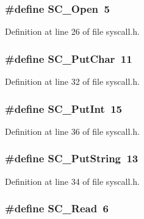 \subsubsection[{S\+C\+\_\+\+Open}]{\setlength{\rightskip}{0pt plus 5cm}\#define S\+C\+\_\+\+Open~5}\label{syscall_8h_a255286805d47cd6f92bebd07591e5b03}


Definition at line 26 of file syscall.\+h.

\subsubsection[{S\+C\+\_\+\+Put\+Char}]{\setlength{\rightskip}{0pt plus 5cm}\#define S\+C\+\_\+\+Put\+Char~11}\label{syscall_8h_a38d80e4a568d866c54e998e4e7f232bf}


Definition at line 32 of file syscall.\+h.

\subsubsection[{S\+C\+\_\+\+Put\+Int}]{\setlength{\rightskip}{0pt plus 5cm}\#define S\+C\+\_\+\+Put\+Int~15}\label{syscall_8h_ae74c882394caef224c4d4e9235418def}


Definition at line 36 of file syscall.\+h.

\subsubsection[{S\+C\+\_\+\+Put\+String}]{\setlength{\rightskip}{0pt plus 5cm}\#define S\+C\+\_\+\+Put\+String~13}\label{syscall_8h_a72a405cdacf79ed873be725e64d9b195}


Definition at line 34 of file syscall.\+h.

\subsubsection[{S\+C\+\_\+\+Read}]{\setlength{\rightskip}{0pt plus 5cm}\#define S\+C\+\_\+\+Read~6}\label{syscall_8h_a2ed7f17c7f089e2b5d3af1f6fc8eb9d9}


